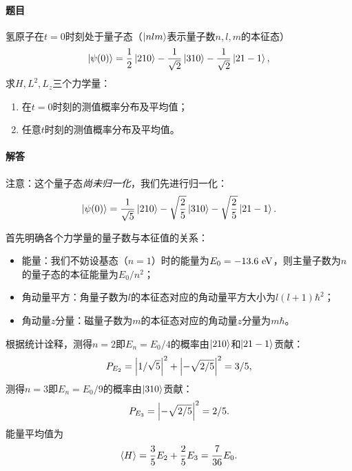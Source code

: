 \begin{tcolorbox}[breakable, title={\textbf{例题：氢原子能级叠加态}}]
    \paragraph{题目}
    氢原子在$t=0$时刻处于量子态（$\ket{nlm}$表示量子数$n,l,m$的本征态）
    \begin{equation}
        \ket{\psi(0)} = \frac12\ket{210} - \frac{1}{\sqrt{2}}\ket{310} - \frac{1}{\sqrt{2}}\ket{21-1},
    \end{equation}
    求$H, L^2, L_z$三个力学量：
    \begin{enumerate}
        \item{在$t=0$时刻的测值概率分布及平均值；}
        \item{任意$t$时刻的测值概率分布及平均值。}
    \end{enumerate}

    \paragraph{解答}

    注意：这个量子态\emph{尚未归一化}，我们先进行归一化：
    \begin{equation}
        \ket{\psi(0)} = \frac{1}{\sqrt{5}}\ket{210} - \sqrt{\frac25}\ket{310} - \sqrt{\frac25}\ket{21-1}.
    \end{equation}

    首先明确各个力学量的量子数与本征值的关系：
    \begin{itemize}
        \item{能量：我们不妨设基态（$n=1$）时的能量为$E_0=-13.6\ \rm{eV}$，则主量子数为$n$的量子态的本征能量为$E_0/n^2$；}
        \item{角动量平方：角量子数为$l$的本征态对应的角动量平方大小为$l(l+1)\hbar^2$；}
        \item{角动量$z$分量：磁量子数为$m$的本征态对应的角动量$z$分量为$m\hbar$。}
    \end{itemize}

    根据统计诠释，测得$n=2$即$E_n=E_0/4$的概率由$\ket{210}$和$\ket{21-1}$贡献：
    \begin{equation}
        P_{E_2} = \abs{1/\sqrt{5}}^2 + \abs{-\sqrt{2/5}}^2 = 3/5,
    \end{equation}
    测得$n=3$即$E_n=E_0/9$的概率由$\ket{310}$贡献：
    \begin{equation}
        P_{E_3} = \abs{-\sqrt{2/5}}^2 = 2/5.
    \end{equation}
    能量平均值为
    \begin{equation}
        \expval{H} = \frac35 E_2 + \frac25 E_3 = \frac{7}{36} E_0.
    \end{equation}


\end{tcolorbox}
